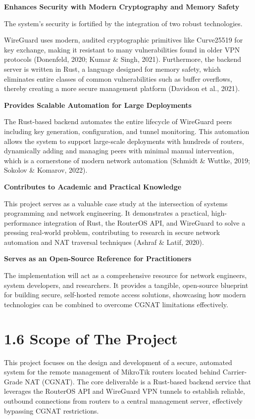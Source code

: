 \documentclass[12pt,a4paper,oneside]{report}
\begin{document}
\textbf{Enhances Security with Modern Cryptography and Memory Safety}


The system's security is fortified by the integration of two robust technologies.


WireGuard uses modern, audited cryptographic primitives like Curve25519 for key exchange, making it resistant to many vulnerabilities found in older VPN protocols (Donenfeld, 2020; Kumar \& Singh, 2021). Furthermore, the backend server is written in Rust, a language designed for memory safety, which eliminates entire classes of common vulnerabilities such as buffer overflows, thereby creating a more secure management platform (Davidson et al., 2021).




\textbf{Provides Scalable Automation for Large Deployments}


The Rust-based backend automates the entire lifecycle of WireGuard peers including key generation, configuration, and tunnel monitoring. This automation allows the system to support large-scale deployments with hundreds of routers, dynamically adding and managing peers with minimal manual intervention, which is a cornerstone of modern network automation (Schmidt \& Wuttke, 2019; Sokolov \& Komarov, 2022).


\textbf{Contributes to Academic and Practical Knowledge}


This project serves as a valuable case study at the intersection of systems programming and network engineering. It demonstrates a practical, high-performance integration of Rust, the RouterOS API, and WireGuard to solve a pressing real-world problem, contributing to research in secure network automation and NAT traversal techniques (Ashraf \& Latif, 2020).




\textbf{Serves as an Open-Source Reference for Practitioners}


The implementation will act as a comprehensive resource for network engineers, system developers, and researchers. It provides a tangible, open-source blueprint for building secure, self-hosted remote access solutions, showcasing how modern technologies can be combined to overcome CGNAT limitations effectively.


\section{1.6 Scope of The Project}

This project focuses on the design and development of a secure, automated system for the remote management of MikroTik routers located behind Carrier-Grade NAT (CGNAT). The core deliverable is a Rust-based backend service that leverages the RouterOS API and WireGuard VPN tunnels to establish reliable, outbound connections from routers to a central management server, effectively bypassing CGNAT restrictions.
\end{document}
